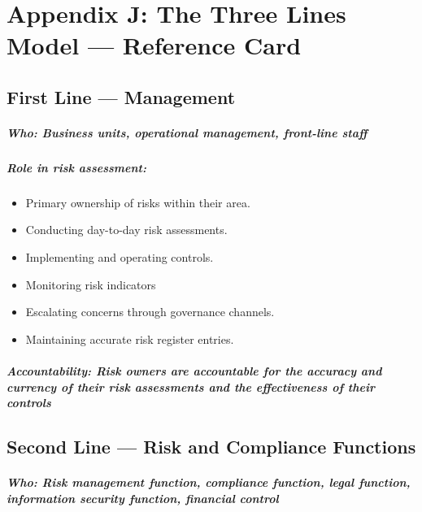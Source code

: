 \chapter*{Appendix J: The Three Lines Model — Reference Card}
\label{chap:Appendix J: The Three Lines Model — Reference Card}

\section*{First Line — Management}
\paragraph{\textit{Who:} Business units, operational management, front-line staff}
\paragraph{\textit{Role in risk assessment:}}
\begin{itemize}
  \item{Primary ownership of risks within their area.}
  \item{Conducting day-to-day risk assessments.}
  \item{Implementing and operating controls.}
  \item{Monitoring risk indicators}
  \item{Escalating concerns through governance channels.}
  \item{Maintaining accurate risk register entries.}
\end{itemize}
\paragraph{\textit{Accountability:} Risk owners are accountable for the accuracy and currency of their risk assessments and the effectiveness of their controls}

\section*{Second Line — Risk and Compliance Functions}
\paragraph{\textit{Who:} Risk management function, compliance function, legal function, information security function, financial control}
